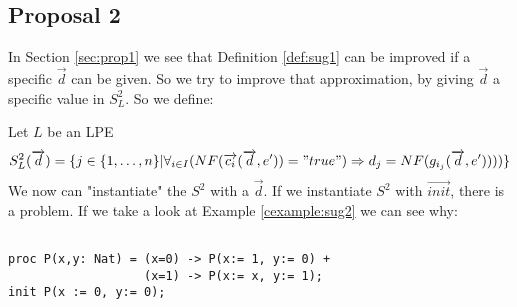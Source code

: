 \documentclass[a4paper,10pt]{article}
\theoremstyle{plain}
\theoremstyle{definition}
\newcommand{\ovr}{\overrightarrow}
\begin{document}
\subsection{Proposal 2}
In Section \ref{sec:prop1} we see that Definition \ref{def:sug1} can be improved if a specific $\ovr{d}$ can be given. So we try to improve that approximation, by giving $\ovr{d}$ a specific value in $S_L^2$. So we define: 

\begin{defn} Let $L$ be an LPE\label{def:sug2} 
\begin{displaymath}
S_L^2(\ovr{d})=
\lbrace   
j \in \lbrace 1, \ldots , n \rbrace \vert \forall_{i\in I} (NF(\ovr{c_i}(\ovr{d},e')) = "true") \Rightarrow d_j = NF(g_{i_j}(\ovr{d},e'))))\rbrace
\end{displaymath}
We now can "instantiate" the $S^2$ with a $\ovr{d}$. If we instantiate $S^2$ with $\ovr{init}$, there is a problem. If we take a look at Example \ref{cexample:sug2} we can see why:
\begin{example} [Let $E2$ be]\label{cexample:sug2}\begin{verbatim} 
 
proc P(x,y: Nat) = (x=0) -> P(x:= 1, y:= 0) +
                   (x=1) -> P(x:= x, y:= 1);
init P(x := 0, y:= 0);


\end{verbatim}
\end{example}
\end{defn}
\end{document}
